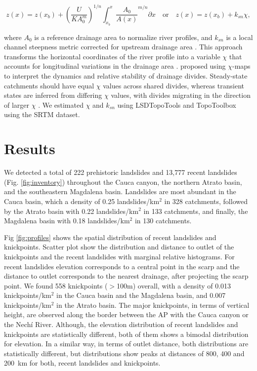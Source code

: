 \documentclass[draft]{agujournal2019}
\begin{document}
\begin{linenomath*}
\begin{equation}
    z(x)= z(x_b)+\left(\frac{U}{KA_0^m}\right)^{1/n}\int_{x_b}^{x} \frac{A_0}{A(x)}^{m/n} \partial{x} \quad \text{or} \quad z(x)=z(x_b)+k_{sn}\chi,
\end{equation}
\end{linenomath*}

where $A_0$ is a reference drainage area to normalize river profiles, and $k_{sn}$ is a local channel steepness metric corrected for upstream drainage area \cite{whipple2017}. This approach transforms the horizontal coordinates of the river profile into a variable $\chi$ that accounts for longitudinal variations in the drainage area \cite{Mudd2014}.  proposed using $\chi$-maps to interpret the dynamics and relative stability of drainage divides. Steady-state catchments should have equal $\chi$ values across shared divides, whereas transient states are inferred from differing $\chi$ values, with divides migrating in the direction of larger $\chi$ \cite{Willett2014}. We estimated $\chi$ and $k_{sn}$ using LSDTopoTools \cite{Mudd2014} and TopoToolbox \cite{Schwanghart_2014} using the SRTM dataset.


\section{Results}

\par We detected a total of 222 prehistoric landslides and 13,777 recent landslides (Fig. \ref{fig:inventory}) throughout the Cauca canyon, the northern Atrato basin, and the southeastern Magdalena basin. Landslides are most abundant in the Cauca basin, which a density of 0.25 landslides/km$^2$ in 328 catchments, followed by the Atrato basin with 0.22 landslides/km$^2$ in 133 catchments, and finally, the Magdalena basin with 0.18 landslides/km$^2$ in 130 catchments.

\par Fig \ref{fig:profiles} shows the spatial distribution of recent landslides and knickpoints.  Scatter plot show the distribution and distance to outlet of the knickpoints and the recent landslides with marginal relative histograms. For recent landslides elevation corresponds to a central point in the scarp and the distance to outlet corresponds to the nearest drainage, after projecting the scarp point. We found 558 knickpoints ($>$100m) overall, with a density of 0.013 knickpoints/km$^2$ in the Cauca basin and the Magdalena basin, and 0.007 knickpoints/km$^2$ in the Atrato basin. The major knickpoints, in terms of vertical height, are observed along the border between the AP with the Cauca canyon or the Nechí River. Although, the elevation distribution of recent landslides and knickpoints are statistically different, both of them shows a bimodal distribution for elevation. In a similar way, in terms of outlet distance, both distributions are statistically different, but distributions show peaks at distances of 800, 400 and 200~km for both, recent landslides and knickpoints.
\end{document}
